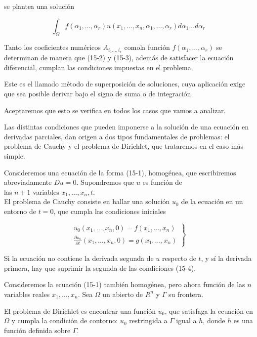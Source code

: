 \documentclass[10pt]{article}
\theoremstyle{plain}
\theoremstyle{definition}
\theoremstyle{remark}
\begin{document}
se plantea una solución


\begin{equation*}
\int_{\Omega} f\left(\alpha_{1}, \ldots, \alpha_{r}\right) u\left(x_{1}, \ldots, x_{n}, \alpha_{1}, \ldots, \alpha_{r}\right) d \alpha_{1} \ldots d \alpha_{r} \tag{15-3}
\end{equation*}


Tanto los coeficientes numéricos $A_{i_{1} \ldots, i_{r}}$ comola función $f\left(\alpha_{1}, \ldots, \alpha_{r}\right)$ se determinan de manera que (15-2) y (15-3), además de satisfacer la ecuación diferencial, cumplan las condiciones impuestas en el problema.

Este es el llamado método de superposición de soluciones, cuya aplicación exige que sea posible derivar bajo el signo de suma o de integración.

Aceptaremos que esto se verifica en todos los casos que vamos a analizar.

Las distintas condiciones que pueden imponerse a la solución de una ecuación en derivadas parciales, dan origen a dos tipos fundamentales de problemas: el problema de Cauchy y el problema de Dirichlet, que trataremos en el caso más simple.

Consideremos una ecuación de la forma (15-1), homogénea, que escribiremos abreviadamente $D u=0$. Supondremos que $u$ es función de\\
las $n+1$ variables $x_{1}, \ldots, x_{n}, t$.\\
El problema de Cauchy consiste en hallar una solución $u_{0}$ de la ecuación en un entorno de $t=0$, que cumpla las condiciones iniciales

\[
\left.\begin{array}{l}
u_{0}\left(x_{1}, \ldots, x_{n}, 0\right)=f\left(x_{1}, \ldots, x_{n}\right)  \tag{15-4}\\
\frac{\partial u_{0}}{\partial t}\left(x_{1}, \ldots, x_{n}, 0\right)=g\left(x_{1}, \ldots, x_{n}\right)
\end{array}\right\}
\]

Si la ecuación no contiene la derivada segunda de $u$ respecto de $t$, y sí la derivada primera, hay que suprimir la segunda de las condiciones (15-4).

Consideremos la ecuación (15-1) también homogénea, pero ahora función de las $n$ variables reales $x_{1}, \ldots, x_{n}$. Sea $\Omega$ un abierto de $R^{n}$ y $\Gamma$ su frontera.

El problema de Dirichlet es encontrar una función $u_{0}$, que satisfaga la ecuación en $\Omega$ y cumpla la condición de contorno: $u_{0}$ restringida a $\Gamma$ igual a $h$, donde $h$ es una función definida sobre $\Gamma$.
\end{document}
